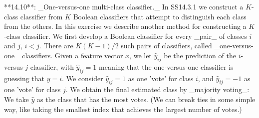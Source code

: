 

**14.10**: _One-versus-one multi-class classifier._ In SS14.3.1 we construct a \(K\)-class classifier from \(K\) Boolean classifiers that attempt to distinguish each class from the others. In this exercise we describe another method for constructing a \(K\)-class classifier. We first develop a Boolean classifier for every _pair_ of classes \(i\) and \(j\), \(i<j\). There are \(K(K-1)/2\) such pairs of classifiers, called _one-versus-one_ classifiers. Given a feature vector \(x\), we let \(\hat{y}_{ij}\) be the prediction of the \(i\)-versus-\(j\) classifier, with \(\hat{y}_{ij}=1\) meaning that the one-versus-one classifier is guessing that \(y=i\). We consider \(\hat{y}_{ij}=1\) as one 'vote' for class \(i\), and \(\hat{y}_{ij}=-1\) as one 'vote' for class \(j\). We obtain the final estimated class by _majority voting_: We take \(\hat{y}\) as the class that has the most votes. (We can break ties in some simple way, like taking the smallest index that achieves the largest number of votes.)

